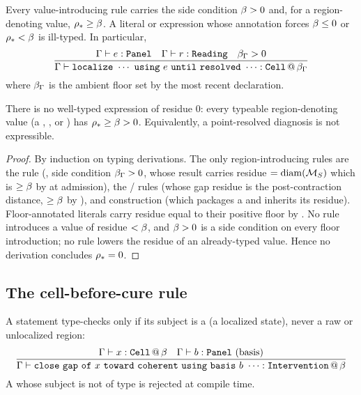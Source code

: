 \begin{rulename}
\label{cfc:rule:positivity}
Every value-introducing rule carries the side condition $\beta>0$ and, for a
region-denoting value, $\rho_{\ast}\ge\beta$. A literal or expression whose
annotation forces $\beta\le0$ or $\rho_{\ast}<\beta$ is ill-typed. In particular,
\[
\frac{\Gamma\vdash e:\cfckw{Panel}\quad\Gamma\vdash r:\cfckw{Reading}\quad\flo_\Gamma>0}
     {\Gamma\vdash \cfckw{localize}\ \cdots\ \cfckw{using}\ e\ \cfckw{until}\ \cfckw{resolved}\ \cdots:\cfckw{Cell}\,@\,\flo_\Gamma}
\]
where $\beta_\Gamma$ is the ambient floor set by the most recent 
declaration.
\end{rulename}

\begin{theorem}
\label{cfc:thm:no-zero}
There is no well-typed  expression of residue $0$: every typeable
region-denoting value (a , , or ) has
$\rho_{\ast}\ge\beta>0$. Equivalently, a point-resolved diagnosis is not
expressible.
\end{theorem}

\begin{proof}
By induction on typing derivations. The only region-introducing rules are the
 rule (, side condition $\beta_\Gamma>0$,
whose result carries residue $=\operatorname{diam}(\mathcal{M}_S)$ which is $\ge\beta$ by
 at admission), the / rules (whose gap
residue is the post-contraction distance, $\ge\beta$ by ),
and  construction (which packages a  and inherits its
residue). Floor-annotated literals carry residue equal to their positive floor
by . No rule introduces a value of residue $<\beta$, and
$\beta>0$ is a side condition on every floor introduction; no rule lowers the
residue of an already-typed value. Hence no derivation concludes
$\rho_{\ast}=0$.
\end{proof}

\subsection{The cell-before-cure rule}

\begin{rulename}
\label{cfc:rule:cell-first}
A  statement type-checks only if its subject is a 
(a localized state), never a raw  or unlocalized region:
\[
\frac{\Gamma\vdash x:\cfckw{Cell}\,@\,\flo\quad\Gamma\vdash b:\cfckw{Panel}\ \text{(basis)}}
     {\Gamma\vdash \cfckw{close}\ \cfckw{gap}\ \cfckw{of}\ x\ \cfckw{toward}\ \cfckw{coherent}\ \cfckw{using}\ \cfckw{basis}\ b\ \cdots:\cfckw{Intervention}\,@\,\flo}
\]
A  whose subject is not of type  is rejected at compile time.
\end{rulename}

